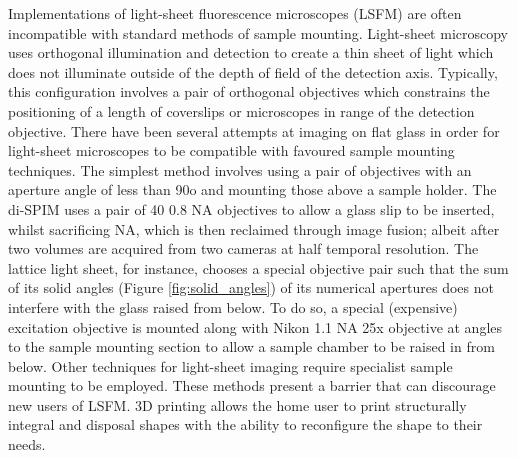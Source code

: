 Implementations of light-sheet fluorescence microscopes (LSFM) are often incompatible with standard methods of sample mounting. Light-sheet microscopy uses orthogonal illumination and detection to create a thin sheet of light which does not illuminate outside of the depth of field of the detection axis.
 Typically, this configuration involves a pair of orthogonal objectives which constrains the positioning of a length of coverslips or microscopes in range of the detection objective.
 There have been several attempts at imaging on flat glass in order for light-sheet microscopes to be compatible with favoured sample mounting techniques.
 The simplest method involves using a pair of objectives with an aperture angle of less than 90o and mounting those above a sample holder.
 The di-SPIM\cite{1} uses a pair of \SI{40}{\times} 0.8 NA objectives to allow a glass slip to be inserted, whilst sacrificing NA, which is then reclaimed through image fusion; albeit after two volumes are acquired from two cameras at half temporal resolution.
 The lattice light sheet\cite{2}, for instance, chooses a special objective pair such that the sum of its solid angles (Figure \ref{fig:solid_angles}) of its numerical apertures does not interfere with the glass raised from below.
 To do so, a special (expensive) excitation objective is mounted along with Nikon 1.1 NA 25x objective at angles to the sample mounting section to allow a sample chamber to be raised in from below.
 Other techniques for light-sheet imaging require specialist sample mounting to be employed.
 These methods present a barrier that can discourage new users of LSFM.
 3D printing allows the home user to print structurally integral and disposal shapes with the ability to reconfigure the shape to their needs.


